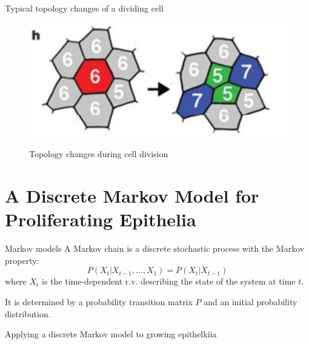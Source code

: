 \documentclass[aspectratio=169, 10pt]{beamer}
\begin{document}
\begin{frame}[fragile]{Typical topology changes of a dividing cell}
  \begin{figure}[]
    \centering
    \caption{Topology changes during cell division}
    \includegraphics[width=.5\textwidth]{figures/topology_evolution.png} 
    \label{}
  \end{figure}
\end{frame}

\section{A Discrete Markov Model for Proliferating Epithelia}

\begin{frame}[fragile]{Markov models}
    A Markov chain is a discrete stochastic process with the Markov property:
    \begin{equation*}
      P(X_t|X_{t-1},\ldots,X_1)=P(X_t|X_{t-1})
    \end{equation*}
    where $X_t$ is the time-dependent r.v. describing the state of the system at time $t$. 
    
    It is determined by a probability transition matrix $P$ and an initial probability distribution. 

\end{frame}

\begin{frame}[fragile]{Applying a discrete Markov model to growing epithelkiia}
  \begin{columns}
    \column{\textwidth}
    \begin{table}
      \centering
    \end{table}
  \end{columns}
\end{frame}
\end{document}
